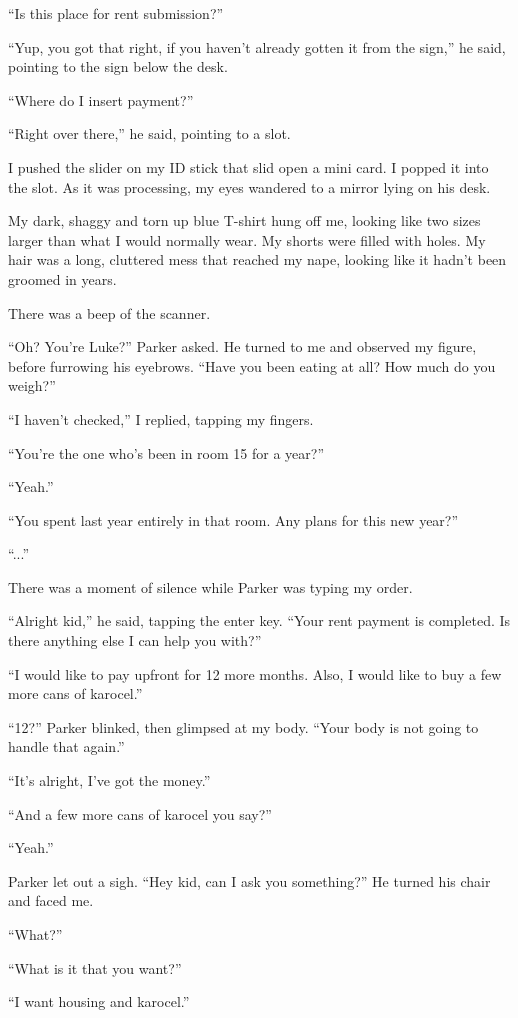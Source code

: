 “Is this place for rent submission?”

“Yup, you got that right, if you haven’t already gotten it from the sign,” he said, pointing to the sign below the desk.

“Where do I insert payment?”

“Right over there,” he said, pointing to a slot.

I pushed the slider on my ID stick that slid open a mini card. I popped it into the slot. As it was processing, my eyes wandered to a mirror lying on his desk.

My dark, shaggy and torn up blue T-shirt hung off me, looking like two sizes larger than what I would normally wear. My shorts were filled with holes. My hair was a long, cluttered mess that reached my nape, looking like it hadn’t been groomed in years. 

There was a beep of the scanner.

“Oh? You’re Luke?” Parker asked. He turned to me and observed my figure, before furrowing his eyebrows. “Have you been eating at all? How much do you weigh?”

“I haven’t checked,” I replied, tapping my fingers.

“You’re the one who’s been in room 15 for a year?”

“Yeah.”

“You spent last year entirely in that room. Any plans for this new year?”

“...”

There was a moment of silence while Parker was typing my order.

“Alright kid,” he said, tapping the enter key. “Your rent payment is completed. Is there anything else I can help you with?”

“I would like to pay upfront for 12 more months. Also, I would like to buy a few more cans of karocel.”

“12?” Parker blinked, then glimpsed at my body. “Your body is not going to handle that again.”

“It’s alright, I’ve got the money.”

“And a few more cans of karocel you say?”

“Yeah.”

Parker let out a sigh. “Hey kid, can I ask you something?” He turned his chair and faced me.

“What?”

“What is it that you want?”

“I want housing and karocel.”

